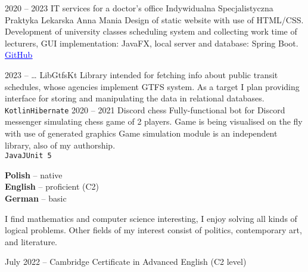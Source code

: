 \documentclass[8pt]{developercv} %
\begin{document}


\begin{entrylist}
  \entry
    {2020 -- 2023}
    {IT services for a doctor's office}
    {Indywidualna Specjalistyczna Praktyka Lekarska Anna Mania}
    {
      Design of static website with use of HTML/CSS.
      Development of university classes scheduling system and collecting work time of lecturers,
      GUI implementation: JavaFX, local server and database: Spring Boot.
      \href{https://github.com/pulkowski-jan/timetablescheduler}{
        \textcolor{blue}{\underline{GitHub}}
      }
    }
\end{entrylist}


\begin{entrylist}
  \entry
    {2023 -- \ldots}
    {LibGtfsKt}
    {}
    {
      Library intended for fetching info about public transit schedules, whose agencies implement GTFS system.
      As a target I plan providing interface for storing and manipulating the data in relational databases.
      \\\texttt{Kotlin}\slashsep\texttt{Hibernate}
    }
  \entry
    {2020 -- 2021}
    {Discord chess}
    {}
    {
      Fully-functional bot for Discord messenger simulating chess game of 2 players.
      Game is being visualised on the fly with use of generated graphics
      Game simulation module is an independent library, also of my authorship.
      \\\texttt{Java}\slashsep\texttt{JUnit 5}
    }
\end{entrylist}



\begin{minipage}[t]{0.3\textwidth}
  \vspace{-\baselineskip}


  \textbf{Polish} -- native\\
  \textbf{English} -- proficient (C2)\\
  \textbf{German} -- basic
\end{minipage}
\hfill
\begin{minipage}[t]{0.3\textwidth}
  \vspace{-\baselineskip}

  I find mathematics and computer science interesting,
  I enjoy solving all kinds of logical problems.
  Other fields of my interest consist of politics, contemporary art, and literature.
\end{minipage}
\hfill
\begin{minipage}[t]{0.35\textwidth}
  \vspace{-\baselineskip}

  July 2022 -- Cambridge Certificate in Advanced English (C2 level)
\end{minipage}
\end{document}
